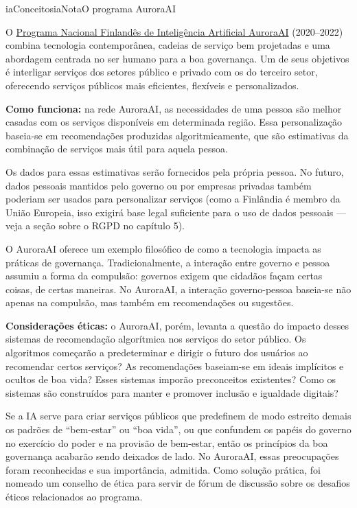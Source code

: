 \documentclass[
  11pt,
]{article}
\newenvironment{tecnica}[1][Nota tecnica]{\begin{iabox}{iaConceitos}{iaNota}{#1}}{\end{iabox}}
\begin{document}
\begin{tecnica}[O programa AuroraAI]

O
\href{https://vm.fi/en/national-artificial-intelligence-programme-auroraai}{Programa
Nacional Finlandês de Inteligência Artificial AuroraAI} (2020--2022)
combina tecnologia contemporânea, cadeias de serviço bem projetadas e
uma abordagem centrada no ser humano para a boa governança. Um de seus
objetivos é interligar serviços dos setores público e privado com os do
terceiro setor, oferecendo serviços públicos mais eficientes, flexíveis
e personalizados.

\textbf{Como funciona:} na rede AuroraAI, as necessidades de uma pessoa
são melhor casadas com os serviços disponíveis em determinada região.
Essa personalização baseia-se em recomendações produzidas
algoritmicamente, que são estimativas da combinação de serviços mais
útil para aquela pessoa.

Os dados para essas estimativas serão fornecidos pela própria pessoa. No
futuro, dados pessoais mantidos pelo governo ou por empresas privadas
também poderiam ser usados para personalizar serviços (como a Finlândia
é membro da União Europeia, isso exigirá base legal suficiente para o
uso de dados pessoais --- veja a seção sobre o RGPD no capítulo 5).

O AuroraAI oferece um exemplo filosófico de como a tecnologia impacta as
práticas de governança. Tradicionalmente, a interação entre governo e
pessoa assumiu a forma da compulsão: governos exigem que cidadãos façam
certas coisas, de certas maneiras. No AuroraAI, a interação
governo-pessoa baseia-se não apenas na compulsão, mas também em
recomendações ou sugestões.

\textbf{Considerações éticas:} o AuroraAI, porém, levanta a questão do
impacto desses sistemas de recomendação algorítmica nos serviços do
setor público. Os algoritmos começarão a predeterminar e dirigir o
futuro dos usuários ao recomendar certos serviços? As recomendações
baseiam-se em ideais implícitos e ocultos de boa vida? Esses sistemas
imporão preconceitos existentes? Como os sistemas são construídos para
manter e promover inclusão e igualdade digitais?

Se a IA serve para criar serviços públicos que predefinem de modo
estreito demais os padrões de ``bem-estar'' ou ``boa vida'', ou que
confundem os papéis do governo no exercício do poder e na provisão de
bem-estar, então os princípios da boa governança acabarão sendo deixados
de lado. No AuroraAI, essas preocupações foram reconhecidas e sua
importância, admitida. Como solução prática, foi nomeado um conselho de
ética para servir de fórum de discussão sobre os desafios éticos
relacionados ao programa.

\end{tecnica}
\end{document}
